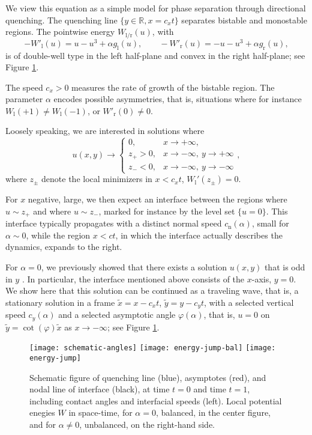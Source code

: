 \documentclass[10pt]{article}
\newcommand{\R}{\mathbb{R}}
\begin{document}
We view this equation as a simple model for phase separation through directional quenching. The quenching line $\{y\in\R,x=c_xt\}$ separates bistable and monostable regions. The pointwise energy $W_\mathrm{l/r}(u)$, with 
\[
-W'_\mathrm{l}(u)=u-u^3+\alpha g_\mathrm{l}(u),\qquad 
-W'_\mathrm{r}(u)=-u-u^3+\alpha g_\mathrm{r}(u),
\]
is of double-well type in the left half-plane and convex in the right half-plane; see Figure \ref{f:1}.

The speed $c_x>0$ measures the rate of growth of the bistable region. The parameter $\alpha$ encodes possible asymmetries, that is, situations where for instance $W_\mathrm{l}(+1)\neq W_\mathrm{l}(-1)$, or $W'_\mathrm{r}(0)\neq 0$. 

Loosely speaking, we are interested in solutions where 
\begin{equation}\label{e:bc0}
u(x,y)\longrightarrow \left\{\begin{array}{ll} 
0,& x\to +\infty,\\
z_+>0,& x\to -\infty,\ y\to +\infty\\
z_-<0,& x\to -\infty,\ y\to -\infty
\end{array}\right.,
\end{equation}
where $z_\pm$ denote the local minimizers in $x<c_xt$,  $W_\mathrm{l}'(z_\pm)=0$. 

For $x$ negative, large, we then expect an interface between the regions where $u\sim z_+$ and where $u\sim z_-$, marked for instance by the level set  $\{u=0\}$. This interface typically propagates with a distinct normal speed $c_\mathrm{n}(\alpha)$, small for $\alpha\sim 0$, while the region  $x<ct$, in which the interface actually describes the dynamics, expands to the right. 

For $\alpha=0$, we previously showed that there exists a solution $u(x,y)$ that is odd in $y$ \cite{Monteiro_Scheel}. In particular, the interface mentioned above consists of the $x$-axis, $y=0$. We show here that this solution can be continued as a traveling wave, that is, a stationary solution in a frame $\tilde{x}=x-c_x t$, $\tilde{y}=y-c_y t$,  with a selected vertical speed $c_y(\alpha)$ and a selected asymptotic angle $\varphi(\alpha)$, that is, $u=0$ on $\tilde{y}=\cot(\varphi)\tilde{x}$ as $x\to -\infty$; see Figure \ref{f:1}.

\begin{figure}[htb]
\begin{center}
\hspace*{0.2in}\texttt{[image: schematic-angles]} \hfill \texttt{[image: energy-jump-bal]} \hfill
\texttt{[image: energy-jump]}\hspace*{0.2in}
\end{center}
\caption{Schematic figure of quenching line (blue), asymptotes (red), and nodal line  of interface (black), at time $t=0$ and time $t=1$, including contact angles and interfacial speeds (left). Local potential enegies  $W$ in space-time, for $\alpha=0$, balanced, in the center figure, and for $\alpha\neq 0$, unbalanced,  on the right-hand side.\label{f:1}}
\end{figure}
\end{document}
